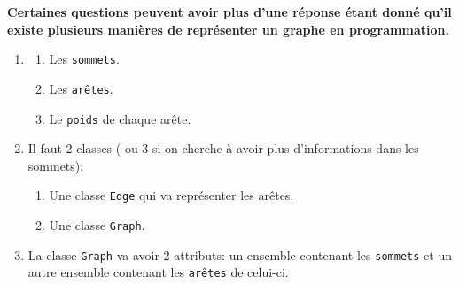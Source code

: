 \textbf{Certaines questions peuvent avoir plus d'une réponse étant donné qu'il existe plusieurs manières de représenter un graphe en programmation. }
    \begin{enumerate}
    \item \begin{enumerate}
          \item Les \lstinline{sommets}.
          \item Les \lstinline{arêtes}.
          \item Le \lstinline{poids} de chaque arête.
          \end{enumerate}
    \item Il faut 2 classes ( ou 3 si on cherche à avoir plus d'informations dans les sommets):
        \begin{enumerate}
        \item Une classe \lstinline{Edge} qui va représenter les arêtes.
        \item Une classe \lstinline{Graph}.
        \end{enumerate}
    \item La classe \lstinline{Graph} va avoir 2 attributs: un ensemble contenant les \lstinline{sommets} et un autre ensemble contenant les \lstinline{arêtes} de celui-ci.
    
        
    \end{enumerate}


